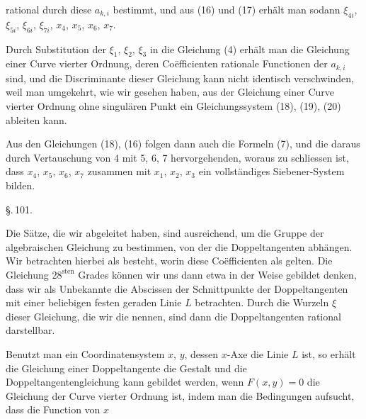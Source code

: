 rational durch diese $a_{k,i}$ bestimmt, und aus (16) und (17) erhält man sodann $\xi_{4i}$, $\xi_{5i}$, $\xi_{6i}$, $\xi_{7i}$, $x_4$, $x_5$, $x_6$, $x_7$.

Durch Substitution der $\xi_1$, $\xi_2$, $\xi_3$ in die Gleichung (4) erhält man die Gleichung einer Curve vierter Ordnung, deren Co\"efficienten rationale Functionen der $a_{k,i}$ sind, und die Discriminante dieser Gleichung kann nicht identisch verschwinden, weil man umgekehrt, wie wir gesehen haben, aus der Gleichung einer Curve vierter Ordnung ohne singulären Punkt ein Gleichungssystem (18), (19), (20) ableiten kann.

Aus den Gleichungen (18), (16) folgen dann auch die Formeln (7), und die daraus durch Vertauschung von 4 mit 5, 6, 7 hervorgehenden, woraus zu schliessen ist, dass $x_4$, $x_5$, $x_6$, $x_7$ zusammen mit $x_1$, $x_2$, $x_3$ ein vollständiges Siebener-System bilden.

\S.\,101.


Die Sätze, die wir abgeleitet haben, sind ausreichend, um die  Gruppe der algebraischen Gleichung zu bestimmen, von der die Doppeltangenten abhängen. Wir betrachten hierbei als  besteht, worin diese Co\"efficienten als  gelten. Die Gleichung $28^{\text{sten}}$ Grades können wir uns dann etwa in der Weise gebildet denken, dass wir als Unbekannte die Abscissen der Schnittpunkte der Doppeltangenten mit einer beliebigen festen geraden Linie $L$ betrachten. Durch die Wurzeln $\xi$ dieser Gleichung, die wir die  nennen, sind dann die Doppeltangenten rational darstellbar.

Benutzt man ein  Coordinatensystem $x$, $y$, dessen $x$-Axe die Linie $L$ ist, so erhält die Gleichung einer Doppeltangente die Gestalt
und die Doppeltangentengleichung kann gebildet werden, wenn $F(x,y) = 0$ die Gleichung der Curve vierter Ordnung ist, indem man die Bedingungen aufsucht, dass die Function von $x$
